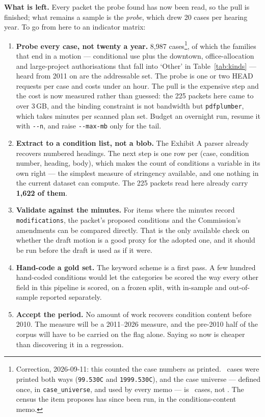 \documentclass[11pt]{article}
\begin{document}
\textbf{What is left.} Every packet the probe found has now been read, so the pull is
finished; what remains a sample is the \emph{probe}, which drew 20 cases per hearing year.
To go from here to an indicator matrix:

\begin{enumerate}
\item \textbf{Probe every case, not twenty a year.} 8{,}987 cases\footnote{Correction,
2026-09-11: this counted the case numbers as printed. \condCaseMerges\ cases were printed both
ways (\texttt{99.530C} and \texttt{1999.530C}), and the case universe --- defined once, in
\texttt{case\_universe}, and used by every memo --- is \condUniverse\ cases, not
\condCasesPrinted. The census the item proposes has since been run, in the conditions-content
memo.}, of which the families that
end in a motion --- conditional use plus the downtown, office-allocation and large-project
authorisations that fall into `Other' in Table~\ref{tab:kinds} --- heard from 2011 on are the
addressable set. The probe is one or two HEAD requests per case and costs under an hour. The
pull is the expensive step and the cost is now measured rather than guessed: the 225 packets
here came to over 3\,GB, and the binding constraint is not bandwidth but
\texttt{pdfplumber}, which takes minutes per scanned plan set. Budget an overnight run,
resume it with \texttt{-{}-n}, and raise \texttt{-{}-max-mb} only for the tail.
\item \textbf{Extract to a condition list, not a blob.} The Exhibit A parser already recovers
numbered headings. The next step is one row per (case, condition number, heading, body), which
makes the count of conditions a variable in its own right --- the simplest measure of
stringency available, and one nothing in the current dataset can compute. The 225 packets read
here already carry \textbf{1{,}622 of them}.
\item \textbf{Validate against the minutes.} For items where the minutes record
\texttt{modifications}, the packet's proposed conditions and the Commission's amendments can be
compared directly. That is the only available check on whether the draft motion is a good proxy
for the adopted one, and it should be run before the draft is used as if it were.
\item \textbf{Hand-code a gold set.} The keyword scheme is a first pass. A few hundred
hand-coded conditions would let the categories be scored the way every other field in this
pipeline is scored, on a frozen split, with in-sample and out-of-sample reported separately.
\item \textbf{Accept the period.} No amount of work recovers condition content before 2010.
The measure will be a 2011--2026 measure, and the pre-2010 half of the corpus will have to be
carried on the flag alone. Saying so now is cheaper than discovering it in a regression.
\end{enumerate}
\end{document}
